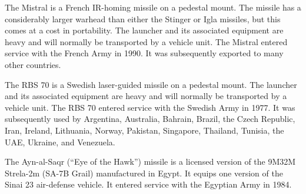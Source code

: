
The Mistral is a French IR-homing missile on a pedestal mount. The missile has a considerably larger warhead than either the Stinger or Igla missiles, but this comes at a cost in portability. The launcher and its associated equipment are heavy and will normally be transported by a vehicle unit.
The Mistral entered service with the French Army in 1990. It was subsequently exported to many other countries.%

The RBS 70 is a Swedish laser-guided missile on a pedestal mount. The launcher and its associated equipment are heavy and will normally be transported by a vehicle unit.
The RBS 70 entered service with the Swedish Army in 1977. It was subsequently used by Argentina, Australia, Bahrain, Brazil, the Czech Republic, Iran, Ireland, Lithuania, Norway, Pakistan, Singapore, Thailand, Tunisia, the UAE, Ukraine, and Venezuela.%


The Ayn-al-Saqr (“Eye of the Hawk”) missile is a  licensed version of the 9M32M Strela-2m (SA-7B Grail) manufactured in Egypt. It equips one version of the Sinai 23 air-defense vehicle.
It entered service with the Egyptian Army in 1984.%

\begin{table}[p]
    \caption*{\hypertarget{table:infantry-sam-unit}{Infantry SAM Unit Table}}
    \centering
    \footnotesize
    
\end{table}

\begin{table}[p]
    \caption*{\hypertarget{table:infantry-sam}{Infantry SAM Table}}
    \centering
    \footnotesize
    
\end{table}
